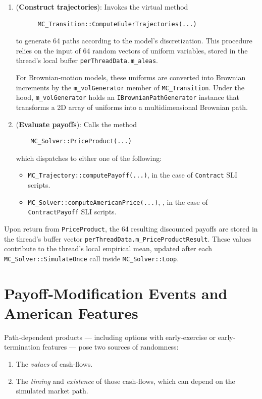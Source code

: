 \documentclass[11pt]{article}
\begin{document}
\begin{enumerate}
  \item (\textbf{Construct trajectories}): Invokes the virtual method  
    \begin{verbatim}
      MC_Transition::ComputeEulerTrajectories(...)
    \end{verbatim}
    
    to generate 64 paths according to the model’s discretization.
    This procedure relies on the input of 64 random vectors of uniform variables, stored in the thread’s local buffer \texttt{perThreadData.m\_aleas}.
    
    For Brownian‐motion models, these uniforms are converted into Brownian increments by the \texttt{m\_volGenerator} member of \texttt{MC\_Transition}.  Under the hood, \texttt{m\_volGenerator} holds an \texttt{IBrownianPathGenerator} instance that transforms a 2D array of uniforms into a multidimensional Brownian path.
    
  \item (\textbf{Evaluate payoffs}): Calls the method
  \begin{verbatim}
    MC_Solver::PriceProduct(...)
    \end{verbatim}
   which dispatches to either one of the following:
    \begin{itemize}
      \item \texttt{MC\_Trajectory::computePayoff(...)}, in the case of \texttt{Contract} SLI scripts.
      \item \texttt{MC\_Solver::computeAmericanPrice(...)}, , in the case of \texttt{ContractPayoff} SLI scripts.
    \end{itemize}
\end{enumerate}

Upon return from \texttt{PriceProduct}, the 64 resulting discounted payoffs are stored in the thread’s buffer vector \texttt{perThreadData.m\_PriceProductResult}. These values contribute to the thread’s local empirical mean, updated after each \texttt{MC\_Solver::SimulateOnce} call inside \texttt{MC\_Solver::Loop}.


\section{Payoff‐Modification Events and American Features}

Path‐dependent products — including options with early‐exercise or early‐termination features — pose two sources of randomness:
\begin{enumerate}
  \item The \emph{values} of cash‐flows.
  \item The \emph{timing} and \emph{existence} of those cash‐flows, which can depend on the simulated market path.
\end{enumerate}
\end{document}
